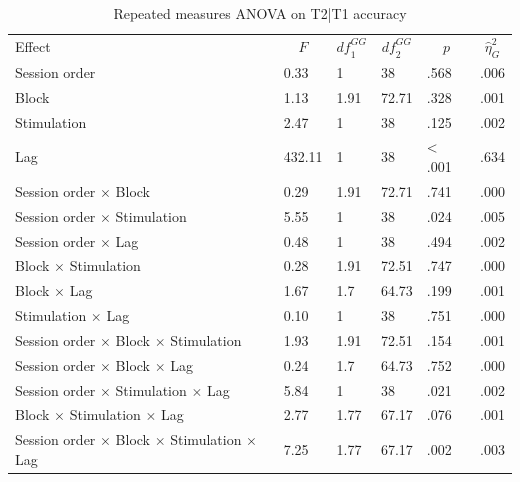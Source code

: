 \documentclass[11pt,english,]{memoir}
\makeatletter
\newcommand\LastLTentrywidth{1em}
\newlength\longtablewidth
\newcommand{\getlongtablewidth}{\begingroup \ifcsname LT@\roman{LT@tables}\endcsname \global\longtablewidth=0pt \renewcommand{\LT@entry}[2]{\global\advance\longtablewidth by ##2\relax\gdef\LastLTentrywidth{##2}}\@nameuse{LT@\roman{LT@tables}} \fi \endgroup}
\makeatother
\begin{document}
\begin{center}
\begin{ThreePartTable}
\small{
\begin{longtable}{llllll}\noalign{\getlongtablewidth\global\LTcapwidth=\longtablewidth}
\caption{\label{tab:tab-anova-T2}Repeated measures ANOVA on T2|T1 accuracy}\\
\toprule
Effect & \multicolumn{1}{c}{$F$} & \multicolumn{1}{c}{$\mathit{df}_1^{GG}$} & \multicolumn{1}{c}{$\mathit{df}_2^{GG}$} & \multicolumn{1}{c}{$p$} & \multicolumn{1}{c}{$\hat{\eta}^2_G$}\\
\midrule
Session order & 0.33 & 1 & 38 & .568 & .006\\
Block & 1.13 & 1.91 & 72.71 & .328 & .001\\
Stimulation & 2.47 & 1 & 38 & .125 & .002\\
Lag & 432.11 & 1 & 38 & < .001 & .634\\
Session order $\times$ Block & 0.29 & 1.91 & 72.71 & .741 & .000\\
Session order $\times$ Stimulation & 5.55 & 1 & 38 & .024 & .005\\
Session order $\times$ Lag & 0.48 & 1 & 38 & .494 & .002\\
Block $\times$ Stimulation & 0.28 & 1.91 & 72.51 & .747 & .000\\
Block $\times$ Lag & 1.67 & 1.7 & 64.73 & .199 & .001\\
Stimulation $\times$ Lag & 0.10 & 1 & 38 & .751 & .000\\
Session order $\times$ Block $\times$ Stimulation & 1.93 & 1.91 & 72.51 & .154 & .001\\
Session order $\times$ Block $\times$ Lag & 0.24 & 1.7 & 64.73 & .752 & .000\\
Session order $\times$ Stimulation $\times$ Lag & 5.84 & 1 & 38 & .021 & .002\\
Block $\times$ Stimulation $\times$ Lag & 2.77 & 1.77 & 67.17 & .076 & .001\\
Session order $\times$ Block $\times$ Stimulation $\times$ Lag & 7.25 & 1.77 & 67.17 & .002 & .003\\
\bottomrule
\end{longtable}
}
\end{ThreePartTable}
\end{center}

\endgroup

\begingroup
\setlength{\LTleft}{-20cm plus -1fill}
\setlength{\LTright}{\LTleft}
\end{document}
